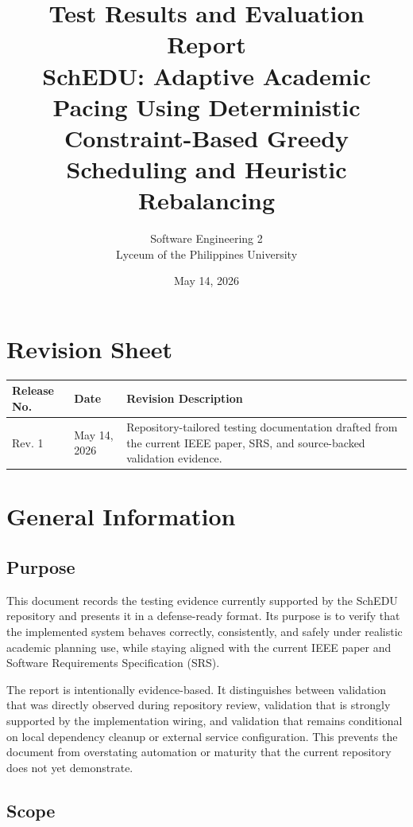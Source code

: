 \documentclass[12pt]{article}
\title{Test Results and Evaluation Report\\[0.4em]
\large SchEDU: Adaptive Academic Pacing Using Deterministic Constraint-Based Greedy Scheduling and Heuristic Rebalancing}
\author{Software Engineering 2 \\ Lyceum of the Philippines University}
\date{May 14, 2026}
\begin{document}
\maketitle
\tableofcontents
\newpage

\section*{Revision Sheet}

\begin{longtable}{|L{2.5cm}|L{2.5cm}|L{9cm}|}
\hline
\textbf{Release No.} & \textbf{Date} & \textbf{Revision Description} \\
\hline
Rev. 1 & May 14, 2026 & Repository-tailored testing documentation drafted from the current IEEE paper, SRS, and source-backed validation evidence. \\
\hline
\end{longtable}

\newpage

\section{General Information}

\subsection{Purpose}

This document records the testing evidence currently supported by the SchEDU repository and presents it in a defense-ready format. Its purpose is to verify that the implemented system behaves correctly, consistently, and safely under realistic academic planning use, while staying aligned with the current IEEE paper and Software Requirements Specification (SRS).

The report is intentionally evidence-based. It distinguishes between validation that was directly observed during repository review, validation that is strongly supported by the implementation wiring, and validation that remains conditional on local dependency cleanup or external service configuration. This prevents the document from overstating automation or maturity that the current repository does not yet demonstrate.

\subsection{Scope}
\end{document}
